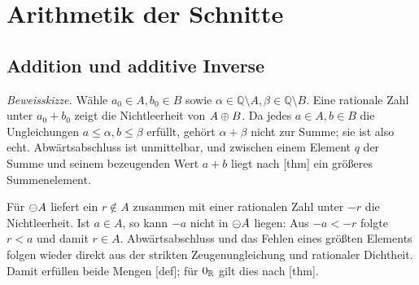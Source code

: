 \documentclass[main.tex]{subfiles}
\begin{document}
\chapter{Arithmetik der Schnitte}

\section{Addition und additive Inverse}





\emph{Beweisskizze.}
Wähle \(a_0\in A,b_0\in B\) sowie
\(\alpha\in\mathbb Q\setminus A,\beta\in\mathbb Q\setminus B\). Eine
rationale Zahl unter \(a_0+b_0\) zeigt die Nichtleerheit von
\(A\mathbin{\oplus} B\). Da jedes \(a\in A,b\in B\) die Ungleichungen
\(a\leq\alpha,b\leq\beta\) erfüllt, gehört \(\alpha+\beta\) nicht zur Summe;
sie ist also echt. Abwärtsabschluss ist unmittelbar, und zwischen einem
Element \(q\) der Summe und seinem bezeugenden Wert \(a+b\) liegt nach
[thm] ein größeres Summenelement.

Für \(\mathop{\ominus}\!A\) liefert ein \(r\notin A\) zusammen mit einer rationalen
Zahl unter \(-r\) die Nichtleerheit. Ist \(a\in A\), so kann \(-a\) nicht in
\(\mathop{\ominus}\!A\) liegen: Aus \(-a<-r\) folgte \(r<a\) und damit \(r\in A\).
Abwärtsabschluss und das Fehlen eines größten Elements folgen wieder direkt
aus der strikten Zeugenungleichung und rationaler Dichtheit. Damit erfüllen
beide Mengen [def]; für \(0_{\mathbb R}\)
gilt dies nach [thm].
\end{document}
